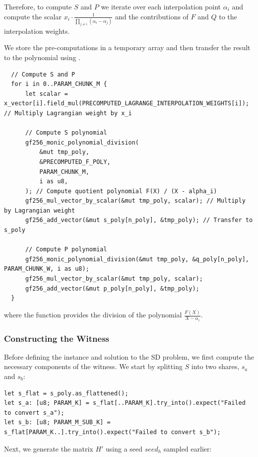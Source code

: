 \documentclass[11pt]{report}
\theoremstyle{definition}
\theoremstyle{plain}
\begin{document}
Therefore, to compute $S$ and $P$ we iterate over each interpolation point $\alpha_i$ and compute the scalar $x_i \cdot \frac{1}{\prod_{j\neq i}(\alpha_i - \alpha_j)}$ and the contributions of $F$ and $Q$ to the interpolation weights.

We store the pre-computations in a temporary array  and then transfer the result to the polynomial  using .
\begin{verbatim}
  // Compute S and P
  for i in 0..PARAM_CHUNK_M {
      let scalar = x_vector[i].field_mul(PRECOMPUTED_LAGRANGE_INTERPOLATION_WEIGHTS[i]); // Multiply Lagrangian weight by x_i

      // Compute S polynomial
      gf256_monic_polynomial_division(
          &mut tmp_poly,
          &PRECOMPUTED_F_POLY,
          PARAM_CHUNK_M,
          i as u8,
      ); // Compute quotient polynomial F(X) / (X - alpha_i)
      gf256_mul_vector_by_scalar(&mut tmp_poly, scalar); // Multiply by Lagrangian weight
      gf256_add_vector(&mut s_poly[n_poly], &tmp_poly); // Transfer to s_poly

      // Compute P polynomial
      gf256_monic_polynomial_division(&mut tmp_poly, &q_poly[n_poly], PARAM_CHUNK_W, i as u8);
      gf256_mul_vector_by_scalar(&mut tmp_poly, scalar);
      gf256_add_vector(&mut p_poly[n_poly], &tmp_poly);
  }
\end{verbatim}

where the function  provides the division of the polynomial $\frac{F(X)}{X - \alpha_i}$.

\subsubsection{Constructing the Witness}

Before defining the instance and solution to the SD problem, we first compute the necessary components of the witness. We start by splitting $S$ into two shares, $s_a$ and $s_b$:

\begin{verbatim}
let s_flat = s_poly.as_flattened();
let s_a: [u8; PARAM_K] = s_flat[..PARAM_K].try_into().expect("Failed to convert s_a");
let s_b: [u8; PARAM_M_SUB_K] = s_flat[PARAM_K..].try_into().expect("Failed to convert s_b");
\end{verbatim}

Next, we generate the matrix $H'$ using a seed $seed_h$ sampled earlier:
\end{document}
